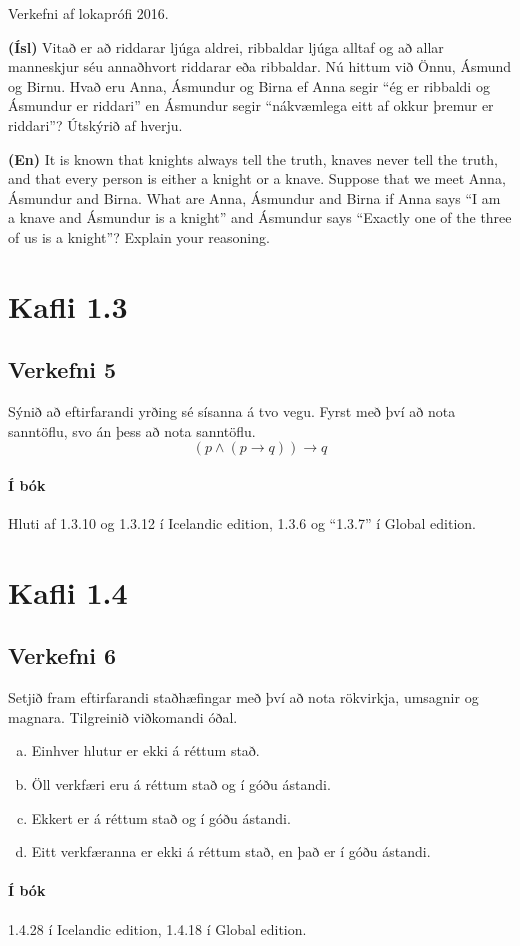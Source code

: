 \documentclass{article}
\begin{document}
Verkefni af lokaprófi 2016.

\textbf{(Ísl)} Vitað er að riddarar ljúga aldrei, ribbaldar ljúga alltaf og að allar manneskjur séu annaðhvort riddarar eða ribbaldar. Nú hittum við Önnu, Ásmund og Birnu. Hvað eru Anna, Ásmundur og Birna ef Anna segir ``ég er ribbaldi og Ásmundur er riddari'' en Ásmundur segir ``nákvæmlega eitt af okkur þremur er riddari''? Útskýrið af hverju.

\textbf{(En)} It is known that knights always tell the truth, knaves never tell the truth, and that every person is either a knight or a knave. Suppose that we meet Anna, Ásmundur and Birna. What are Anna, Ásmundur and Birna if Anna says ``I am a knave and Ásmundur is a knight'' and Ásmundur says ``Exactly one of the three of us is a knight''? Explain your reasoning.

\section{Kafli 1.3}

\subsection{Verkefni 5}
Sýnið að eftirfarandi yrðing sé sísanna á tvo vegu. Fyrst með því að nota sanntöflu, svo án þess að nota sanntöflu.
\[ (p \land (p \to q)) \to q \]

\paragraph{Í bók} Hluti af 1.3.10 og 1.3.12 í Icelandic edition, 1.3.6 og ``1.3.7'' í Global edition.

\section{Kafli 1.4}

\subsection{Verkefni 6} 
Setjið fram eftirfarandi staðhæfingar með því að nota rökvirkja, umsagnir og magnara. Tilgreinið viðkomandi óðal.
\begin{enumerate}[a)]
 \item Einhver hlutur er ekki á réttum stað.
 \item Öll verkfæri eru á réttum stað og í góðu ástandi.
 \item Ekkert er á réttum stað og í góðu ástandi.
 \item Eitt verkfæranna er ekki á réttum stað, en það er í góðu ástandi.
\end{enumerate}

\paragraph{Í bók} 1.4.28 í Icelandic edition, 1.4.18 í Global edition.
\end{document}
